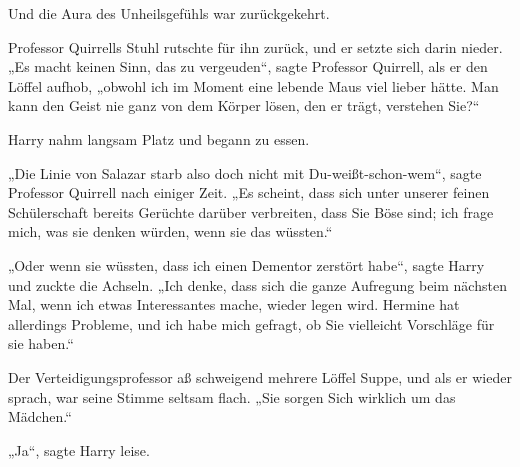 Und die Aura des Unheilsgefühls war zurückgekehrt.

Professor Quirrells Stuhl rutschte für ihn zurück, und er setzte sich darin nieder. „Es macht keinen Sinn, das zu vergeuden“, sagte Professor Quirrell, als er den Löffel aufhob, „obwohl ich im Moment eine lebende Maus viel lieber hätte. Man kann den Geist nie ganz von dem Körper lösen, den er trägt, verstehen Sie?“

Harry nahm langsam Platz und begann zu essen.

\later

„Die Linie von Salazar starb also doch nicht mit Du-weißt-schon-wem“, sagte Professor Quirrell nach einiger Zeit. „Es scheint, dass sich unter unserer feinen Schülerschaft bereits Gerüchte darüber verbreiten, dass Sie Böse sind; ich frage mich, was sie denken würden, wenn sie das wüssten.“

„Oder wenn sie wüssten, dass ich einen Dementor zerstört habe“, sagte Harry und zuckte die Achseln. „Ich denke, dass sich die ganze Aufregung beim nächsten Mal, wenn ich etwas Interessantes mache, wieder legen wird. Hermine hat allerdings Probleme, und ich habe mich gefragt, ob Sie vielleicht Vorschläge für sie haben.“

Der Verteidigungsprofessor aß schweigend mehrere Löffel Suppe, und als er wieder sprach, war seine Stimme seltsam flach. „Sie sorgen Sich wirklich um das Mädchen.“

„Ja“, sagte Harry leise.

